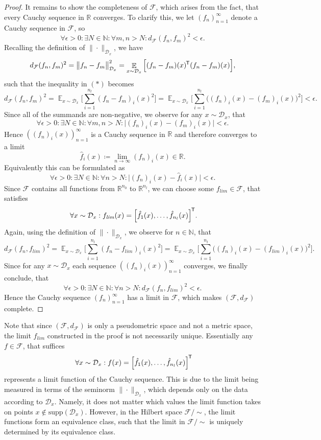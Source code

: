\documentclass[11pt, a4paper]{article}
\newcommand{\N}{\mathbb{N}}
\newcommand{\R}{\mathbb{R}}
\newcommand{\D}{\mathcal{D}}
\newcommand{\F}{\mathcal{F}}
\newcommand*{\tr}{^{\mkern-1.5mu\mathsf{T}}}
\DeclareMathOperator*{\E}{\mathbb{E}}
\begin{document}
\begin{proof}
It remains to show the completeness of $\F$, which arises from the fact, that every Cauchy sequence in $\R$ converges. To clarify this, we let $(f_n)_{n=1}^\infty$ denote a Cauchy sequence in $\F$, so
\begin{equation} \tag{$\ast$} \forall \epsilon > 0 : \exists N \in \N : \forall m,n > N : d_{\F}(f_n, f_m)^2 < \epsilon. \end{equation}
Recalling the definition of $\| \cdot \|_{\D_x}$, we have
\[ d_{\F}(f_n ,f_m)^2 = \big \| f_n - f_m \big \|_{\D_x}^2 = \E_{x \sim \D_x} \Big [ ( f_n - f_m )(x) \tr ( f_n - f_m )(x) \Big ], \]
such that the inequality in $(\ast)$ becomes
\[ d_{\F}(f_n ,f_m)^2 = \E_{x \sim \D_x} \Big [ \sum_{i=1}^{n_l} (f_n - f_m)_i(x)^2 \Big ] = \E_{x \sim \D_x} \Big [ \sum_{i=1}^{n_l} \big ( (f_n)_i(x) - (f_m)_i(x) \big )^2 \Big ] < \epsilon. \]
Since all of the summands are non-negative, we observe for any $x \sim \D_x$, that 
\[ \forall \epsilon > 0 : \exists N \in \N : \forall m,n > N : \big | (f_n)_i(x) - (f_m)_i(x) \big | < \epsilon. \]
Hence $((f_n)_i(x))_{n=1}^\infty$ is a Cauchy sequence in $\R$ and therefore converges to a limit
\[ \hat{f}_i(x) \coloneq \lim_{n \to \infty} (f_n)_i(x) \in \R. \]
Equivalently this can be formulated as
\[ \forall \epsilon > 0 : \exists N \in \N : \forall n > N : \big | (f_n)_i(x) - \hat{f}_i(x) \big | < \epsilon. \]
Since $\F$ contains all functions from $\R^{n_0}$ to $\R^{n_l}$, we can choose some $f_\textit{lim} \in \F$, that satisfies
\[ \forall x \sim \D_x : f_\textit{lim}(x) =  \Big [ \hat{f}_1(x), \dots, \hat{f}_{n_l}(x) \Big ] \tr. \]
Again, using the definition of $\| \cdot \|_{\D_x}$, we observe for $n \in \N$, that
\[ d_{\F}(f_n ,f_\textit{lim})^2 = \E_{x \sim \D_x} \Big [ \sum_{i=1}^{n_l} (f_n - f_\textit{lim})_i(x)^2 \Big ] = \E_{x \sim \D_x} \Big [ \sum_{i=1}^{n_l} \big ( (f_n)_i(x) - (f_\textit{lim})_i(x) \big )^2 \Big ]. \]
Since for any $x \sim \D_x$ each sequence $((f_n)_i(x))_{n=1}^\infty$ converges, we finally conclude, that
\[ \forall \epsilon > 0 : \exists N \in \N : \forall n > N : d_{\F}(f_n, f_\textit{lim})^2 < \epsilon. \]
Hence the Cauchy sequence $(f_n)_{n=1}^\infty$ has a limit in $\F$, which makes $(\F,d_{\F})$ complete.
\end{proof}

Note that since $(\F, d_{\F})$ is only a pseudometric space and not a metric space, the limit $f_\textit{lim}$ constructed in the proof is not necessarily unique. Essentially any $f \in \F$, that suffices 
\[ \forall x \sim \D_x : f(x) =  \Big [ \hat{f}_1(x), \dots, \hat{f}_{n_l}(x) \Big ] \tr \]
represents a limit function of the Cauchy sequence. This is due to the limit being measured in terms of the seminorm $\| \cdot \|_{\D_x}$, which depends only on the data according to $\D_x$. Namely, it does not matter which values the limit function takes on points $x \notin \text{supp}(\D_x)$. However, in the Hilbert space $\F/{\sim}$, the limit functions form an equivalence class, such that the limit in $\F/{\sim}$ is uniquely determined by its equivalence class. \\
\end{document}
